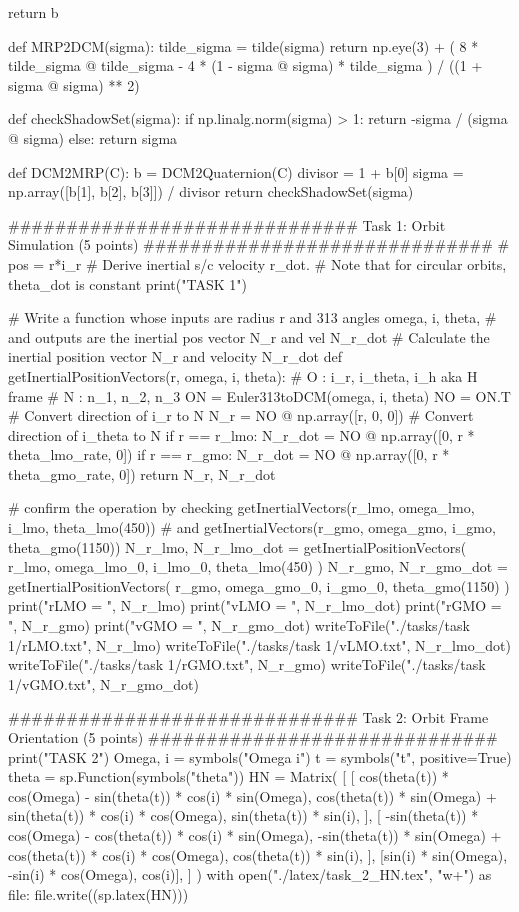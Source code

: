 \documentclass[conf]{new-aiaa}
\begin{document}
\begin{pythoncode}
    return b


def MRP2DCM(sigma):
    tilde_sigma = tilde(sigma)
    return np.eye(3) + (
        8 * tilde_sigma @ tilde_sigma - 4 * (1 - sigma @ sigma) * tilde_sigma
    ) / ((1 + sigma @ sigma) ** 2)


def checkShadowSet(sigma):
    if np.linalg.norm(sigma) > 1:
        return -sigma / (sigma @ sigma)
    else:
        return sigma


def DCM2MRP(C):
    b = DCM2Quaternion(C)
    divisor = 1 + b[0]
    sigma = np.array([b[1], b[2], b[3]]) / divisor
    return checkShadowSet(sigma)


############################## Task 1: Orbit Simulation (5 points) ##############################
# pos = r*i_r
# Derive inertial s/c velocity r_dot.
# Note that for circular orbits, theta_dot is constant
print("\n\nBEGIN TASK 1")


# Write a function whose inputs are radius r and 313 angles omega, i, theta,
# and outputs are the inertial pos vector N_r and vel N_r_dot
# Calculate the inertial position vector N_r and velocity N_r_dot
def getInertialPositionVectors(r, omega, i, theta):
    # O : {i_r, i_theta, i_h} aka H frame
    # N : {n_1, n_2, n_3}
    ON = Euler313toDCM(omega, i, theta)
    NO = ON.T
    # Convert direction of i_r to N
    N_r = NO @ np.array([r, 0, 0])
    # Convert direction of i_theta to N
    if r == r_lmo:
        N_r_dot = NO @ np.array([0, r * theta_lmo_rate, 0])
    if r == r_gmo:
        N_r_dot = NO @ np.array([0, r * theta_gmo_rate, 0])
    return N_r, N_r_dot


# confirm the operation by checking getInertialVectors(r_lmo, omega_lmo, i_lmo, theta_lmo(450))
# and getInertialVectors(r_gmo, omega_gmo, i_gmo, theta_gmo(1150))
N_r_lmo, N_r_lmo_dot = getInertialPositionVectors(
    r_lmo, omega_lmo_0, i_lmo_0, theta_lmo(450)
)
N_r_gmo, N_r_gmo_dot = getInertialPositionVectors(
    r_gmo, omega_gmo_0, i_gmo_0, theta_gmo(1150)
)
print("rLMO = ", N_r_lmo)
print("vLMO = ", N_r_lmo_dot)
print("rGMO = ", N_r_gmo)
print("vGMO = ", N_r_gmo_dot)
writeToFile("./tasks/task 1/rLMO.txt", N_r_lmo)
writeToFile("./tasks/task 1/vLMO.txt", N_r_lmo_dot)
writeToFile("./tasks/task 1/rGMO.txt", N_r_gmo)
writeToFile("./tasks/task 1/vGMO.txt", N_r_gmo_dot)


############################## Task 2: Orbit Frame Orientation (5 points) ##############################
print("\n\nBEGIN TASK 2")
Omega, i = symbols("Omega i")
t = symbols("t", positive=True)
theta = sp.Function(symbols("theta"))
HN = Matrix(
    [
        [
            cos(theta(t)) * cos(Omega) - sin(theta(t)) * cos(i) * sin(Omega),
            cos(theta(t)) * sin(Omega) + sin(theta(t)) * cos(i) * cos(Omega),
            sin(theta(t)) * sin(i),
        ],
        [
            -sin(theta(t)) * cos(Omega) - cos(theta(t)) * cos(i) * sin(Omega),
            -sin(theta(t)) * sin(Omega) + cos(theta(t)) * cos(i) * cos(Omega),
            cos(theta(t)) * sin(i),
        ],
        [sin(i) * sin(Omega), -sin(i) * cos(Omega), cos(i)],
    ]
)
with open("./latex/task_2_HN.tex", "w+") as file:
    file.write((sp.latex(HN)))



\end{pythoncode}
\end{document}
